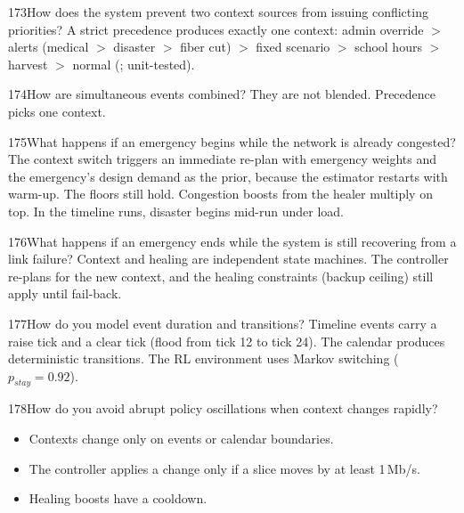 \begin{qa}{173}{How does the system prevent two context sources from issuing conflicting priorities?}
A strict precedence produces exactly one context: admin override $>$ alerts (medical $>$ disaster $>$ fiber cut) $>$
fixed scenario $>$ school hours $>$ harvest $>$ normal (; unit-tested).
\end{qa}

\begin{qa}{174}{How are simultaneous events combined?}
They are not blended. Precedence picks one context.
\end{qa}

\begin{qa}{175}{What happens if an emergency begins while the network is already congested?}
The context switch triggers an immediate re-plan with emergency weights and the emergency's design demand as the
prior, because the estimator restarts with warm-up. The floors still hold. Congestion boosts from the healer multiply
on top. In the timeline runs, disaster begins mid-run under load.
\end{qa}

\begin{qa}{176}{What happens if an emergency ends while the system is still recovering from a link failure?}
Context and healing are independent state machines. The controller re-plans for the new context, and the healing
constraints (backup ceiling) still apply until fail-back.
\end{qa}

\begin{qa}{177}{How do you model event duration and transitions?}
Timeline events carry a raise tick and a clear tick (flood from tick 12 to tick 24). The calendar produces
deterministic transitions. The RL environment uses Markov switching ($p_{stay}=0.92$).
\end{qa}

\begin{qa}{178}{How do you avoid abrupt policy oscillations when context changes rapidly?}
\begin{itemize}
\item Contexts change only on events or calendar boundaries.
\item The controller applies a change only if a slice moves by at least 1\,Mb/s.
\item Healing boosts have a cooldown.
\end{itemize}
\end{qa}

